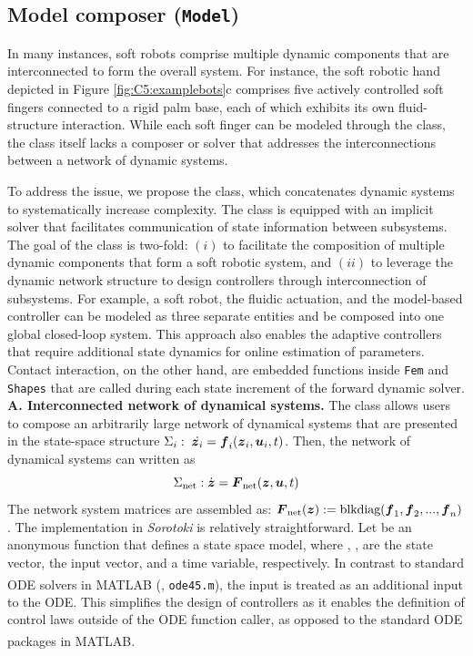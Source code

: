 
\subsection{Model composer (\texttt{Model})}
\label{sec:C5:model}
In many instances, soft robots comprise multiple dynamic components that are interconnected to form the overall system. For instance, the soft robotic hand depicted in Figure \ref{fig:C5:examplebots}c comprises five actively controlled soft fingers connected to a rigid palm base, each of which exhibits its own fluid-structure interaction. While each soft finger can be modeled through the  class, the class itself lacks a composer or solver that addresses the interconnections between a network of dynamic systems.

To address the issue, we propose the  class, which concatenates dynamic systems to systematically increase complexity. The class is equipped with an implicit solver that facilitates communication of state information between subsystems. The goal of the  class is two-fold: $(i)$ to facilitate the composition of multiple dynamic components that form a soft robotic system, and $(ii)$ to leverage the dynamic network structure to design controllers through interconnection of subsystems.
For example, a soft robot, the fluidic actuation, and the model-based controller can be modeled as three separate entities and be composed into one global closed-loop system. This approach also enables the adaptive controllers that require additional state dynamics for online estimation of parameters. Contact interaction, on the other hand, are embedded functions inside \texttt{Fem} and \texttt{Shapes} that are called during each state increment of the forward dynamic solver. \\

\textbf{A. Interconnected network of dynamical systems.} The class  allows users to compose an arbitrarily large network of dynamical systems that are presented in the state-space structure $\Sigma_i:\; \dot{{\boldsymbol{z}}_i} = {\boldsymbol{f}}_{i}({\boldsymbol{z}}_i, {\boldsymbol{u}}_i, t)$. Then, the network of dynamical systems can written as
%
\begin{equation}
    \Sigma_{\textrm{net}}: \dot{{\boldsymbol{z}}} = {\boldsymbol{F}}_{\textrm{net}}({\boldsymbol{z}}, {\boldsymbol{u}}, t)
    \label{eq:C5:dynamicnetwork}
\end{equation}
%
The network system matrices are assembled as: ${\boldsymbol{F}}_{\textrm{net}}({\boldsymbol{z}}) := \textrm{blkdiag}({\boldsymbol{f}}_{1},{\boldsymbol{f}}_{2},...,{\boldsymbol{f}}_{n})$. The implementation in \textit{Sorotoki} is relatively straightforward. Let  be an anonymous function that defines a state space model, where , ,  are the state vector, the input vector, and a time variable, respectively. In contrast to standard ODE solvers in {MATLAB}\textsuperscript{\scriptsize\textregistered} (\eg, \texttt{ode45.m}), the input  is treated as an additional input to the ODE. This simplifies the design of controllers as it enables the definition of control laws outside of the ODE function caller, as opposed to the standard ODE packages in {MATLAB}\textsuperscript{\scriptsize\textregistered}.

